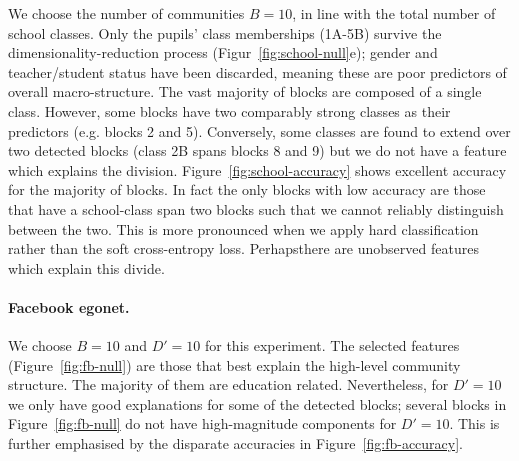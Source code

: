 We choose the number of communities $B=10$, in line with the total number of 
school classes. Only the pupils' class memberships (1A-5B) survive
the dimensionality-reduction process (Figur~\ref{fig:school-null}e);
gender and teacher/student status have been discarded,
meaning these are poor predictors of overall macro-structure.
%
The vast majority of blocks are composed of a single class. 
However, some blocks have two comparably strong classes as their predictors (e.g. blocks 2 and 5). 
Conversely, some classes are found to extend over two 
detected blocks (class 2B spans blocks 8 and 9) but we do 
not have a feature which explains the division.
%
Figure~\ref{fig:school-accuracy} shows excellent accuracy for the majority of blocks. In fact the only blocks with low accuracy are those that have a school-class span two blocks such that we cannot reliably distinguish between the two. This is more pronounced when we apply hard classification rather than the soft cross-entropy loss. Perhapsthere are unobserved features which explain this divide.

\paragraph{\textbf{Facebook egonet.}}

We choose $B=10$ and $D'=10$ for this experiment. The selected features 
(Figure~\ref{fig:fb-null}) are those that best explain the high-level 
community structure. The majority of them are education related. 
Nevertheless, for $D'=10$ we only have good explanations for some of the detected blocks; several blocks in 
Figure~\ref{fig:fb-null} do not have high-magnitude components for $D'=10$. This is further emphasised by the disparate accuracies in Figure~\ref{fig:fb-accuracy}.